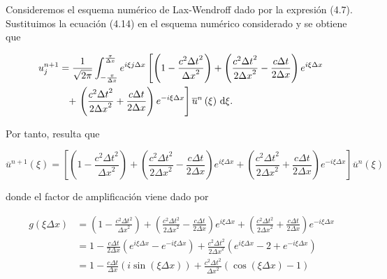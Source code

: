 \begin{example}
  Consideremos el esquema numérico de Lax-Wendroff dado por la
  expresión (4.7).
  Sustituimos la ecuación (4.14) en el esquema numérico considerado
  y se obtiene que

  \begin{gather*}
    \begin{split}
      u^{n+1}_{j}
       & =
      \frac{1}{\sqrt{2\pi}}
      \int_{-\frac{\pi}{\Delta x}}^{\frac{\pi}{\Delta x}}
      e^{i\xi j\Delta x}
      \left[
        \left(
        1-
        \frac{c^{2}{\Delta t}^{2}}{{\Delta x}^{2}}
        \right)+
        \left(
        \frac{c^{2}{\Delta t}^{2}}{2{\Delta x}^{2}}-
        \frac{c\Delta t}{2\Delta x}
        \right)
      e^{i\xi\Delta x}\right. \\
       & \phantom{=}
        +\left.
        \left(
        \frac{c^{2}{\Delta t}^{2}}{2{\Delta x}^{2}}+
        \frac{c\Delta t}{2\Delta x}
        \right)
        e^{-i\xi\Delta x}
        \right]
      \overline{u}^{n}
      \left(\xi\right)\dl\xi.
    \end{split}
  \end{gather*}

  Por tanto, resulta que

  \begin{equation*}
    \overline{u}^{n+1}
    \left(\xi\right)=
    \left[
      \left(
      1-
      \frac{c^{2}{\Delta t}^{2}}{{\Delta x}^{2}}
      \right)+
      \left(
      \frac{c^{2}{\Delta t}^{2}}{2{\Delta x}^{2}}-
      \frac{c\Delta t}{2\Delta x}
      \right)
      e^{i\xi\Delta x}+
      \left(
      \frac{c^{2}{\Delta t}^{2}}{2{\Delta x}^{2}}+
      \frac{c\Delta t}{2\Delta x}
      \right)
      e^{-i\xi\Delta x}
      \right]
    \overline{u}^{n}
    \left(\xi\right)
  \end{equation*}

  donde el factor de amplificación viene dado por

  \begin{align*}
    g
    \left(\xi\Delta x\right) & =
    \left(
    1-
    \frac{c^{2}{\Delta t}^{2}}{{\Delta x}^{2}}
    \right)+
    \left(
    \frac{c^{2}{\Delta t}^{2}}{2{\Delta x}^{2}}-
    \frac{c\Delta t}{2\Delta x}
    \right)
    e^{i\xi\Delta x}+
    \left(
    \frac{c^{2}{\Delta t}^{2}}{2{\Delta x}^{2}}+
    \frac{c\Delta t}{2\Delta x}
    \right)
    e^{-i\xi\Delta x}            \\
                             & =
    1-
    \frac{c\Delta t}{2\Delta x}
    \left(e^{i\xi\Delta x}-
    e^{-i\xi\Delta x}\right)+
    \frac{c^{2}{\Delta t}^{2}}{2{\Delta x}^{2}}
    \left(e^{i\xi\Delta x}-
    2+
    e^{-i\xi\Delta x}\right)     \\
                             & =
    1-\frac{c\Delta t}{\Delta x}
    \left(
    i\sin
    \left(\xi\Delta x\right)
    \right)+
    \frac{c^{2}{\Delta t}^{2}}{{\Delta x}^{2}}
    \left(
    \cos
    \left(\xi\Delta x\right)-
    1
    \right)
  \end{align*}


\end{example}
